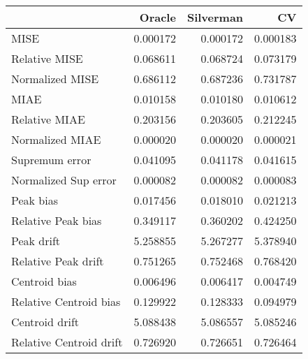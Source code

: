 \begin{tabular}{lrrr}
  \toprule
 & Oracle & Silverman & CV \\ 
  \midrule
MISE & 0.000172 & 0.000172 & 0.000183 \\ 
  Relative MISE & 0.068611 & 0.068724 & 0.073179 \\ 
  Normalized MISE & 0.686112 & 0.687236 & 0.731787 \\ 
  MIAE & 0.010158 & 0.010180 & 0.010612 \\ 
  Relative MIAE & 0.203156 & 0.203605 & 0.212245 \\ 
  Normalized MIAE & 0.000020 & 0.000020 & 0.000021 \\ 
  Supremum error & 0.041095 & 0.041178 & 0.041615 \\ 
  Normalized Sup error & 0.000082 & 0.000082 & 0.000083 \\ 
  Peak bias & 0.017456 & 0.018010 & 0.021213 \\ 
  Relative Peak bias & 0.349117 & 0.360202 & 0.424250 \\ 
  Peak drift & 5.258855 & 5.267277 & 5.378940 \\ 
  Relative Peak drift & 0.751265 & 0.752468 & 0.768420 \\ 
  Centroid bias & 0.006496 & 0.006417 & 0.004749 \\ 
  Relative Centroid bias & 0.129922 & 0.128333 & 0.094979 \\ 
  Centroid drift & 5.088438 & 5.086557 & 5.085246 \\ 
  Relative Centroid drift & 0.726920 & 0.726651 & 0.726464 \\ 
   \bottomrule
\end{tabular}
